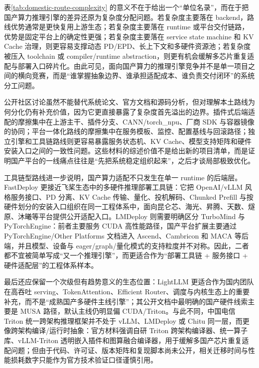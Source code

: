 表\ref{tab:domestic-route-complexity} 的意义不在于给出一个“单位名录”，而在于把国产算力推理引擎的差异还原为复杂度分配问题。若复杂度主要落在 backend，路线优势通常是更快复用上游生态；若复杂度主要落在 runtime 或平台交付链路，优势是固定平台上的确定性更强；若复杂度主要落在 service state machine 和 KV Cache 治理，则更容易支撑动态 PD/EPD、长上下文和多硬件资源池；若复杂度被压入 toolchain 或 compiler/runtime abstraction，则更有机会缓解多芯片重复适配与部署入口碎片化。由此可见，面向国产算力的推理引擎竞争并不是单一项目之间的横向竞赛，而是“谁掌握抽象边界、谁承担适配成本、谁负责交付闭环”的系统分工问题。

公开社区讨论虽然不能替代系统论文、官方文档和源码分析，但对理解本土路线为何分化仍有补充价值，因为它更直接暴露了复杂度首先溢出的边界。插件式后端适配的摩擦集中在上游主干、插件分支、CANN/torch\_npu、厂商 SDK 与容器镜像的协同；平台一体化路线的摩擦集中在服务模板、监控、配置基线与回滚路径；独立引擎和工具链路线则更容易暴露服务状态机、KV Cache、模型支持矩阵和硬件安装入口之间的一致性问题\citep{zhihu_vllm_ascend_guide,zhihu_vllm_pd_migration,zhihu_mindie_deploy,zhihu_lmdeploy_domestic,xllm_service,fastdeploy_docs}。这些材料的综述价值不是给出新的项目清单，而是证明国产平台的一线痛点往往是“先把系统稳定组织起来”，之后才谈局部极致优化。

工具链型路线进一步说明，国产算力适配不只发生在单一 runtime 的后端层。FastDeploy 更接近飞桨生态中的多硬件推理部署工具链：它把 OpenAI/vLLM 风格服务接口、PD 分离、KV Cache 传输、量化、投机解码、Chunked Prefill 与按硬件划分的安装入口组织在同一工程体系中，面向昆仑芯、海光、昇腾、天数、燧原、沐曦等平台提供公开适配入口\citep{fastdeploy,fastdeploy_docs}。LMDeploy 则需要明确区分 TurboMind 与 PyTorchEngine：前者主要服务 CUDA 高性能路径，国产平台扩展主要通过 PyTorchEngine/Other Platforms 文档进入 Ascend、Cambricon 和 MACA 等后端，并且模型、设备与 eager/graph/量化模式的支持粒度并不对称\citep{lmdeploy,lmdeploy_install,lmdeploy_supported_models}。因此，二者都不宜被简单写成“又一个推理引擎”，而更适合作为“部署工具链 + 服务接口 + 硬件适配层”的工程体系样本。

最后还应保留一个次级但有趋势意义的生态位置：LightLLM 更适合作为国内团队在高吞吐 serving、TokenAttention、Efficient Router、调度与内核生态上的重要补充，而不是“成熟国产多硬件主线引擎”；其公开文档中最明确的国产硬件线索主要是 MUSA 路径，默认主线仍明显偏 CUDA/Triton\citep{lightllm,lightllm_docs_2026,gong2025past}。与此不同，中国电信 Triton 统一跨架构推理框架并不处于 vLLM、LMDeploy 或 Chitu 同一层，而更像跨架构编译/运行时抽象：官方材料强调自研 Triton 跨架构编译器、统一算子库、vLLM-Triton 透明嵌入插件和图算融合编译器，用于缓解多国产芯片重复适配问题；但由于代码、许可证、版本矩阵和复现脚本尚未公开，相关迁移时间与性能损耗数字只能作为官方技术验证口径谨慎引用\citep{chinatelecom_triton_validation_2025,chinatelecom_wbba_2026}。


